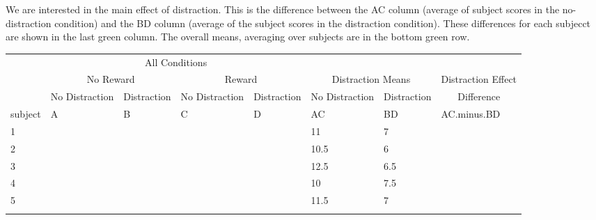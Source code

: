 \documentclass[
]{book}
\begin{document}
We are interested in the main effect of distraction. This is the difference between the AC column (average of subject scores in the no-distraction condition) and the BD column (average of the subject scores in the distraction condition). These differences for each subjecct are shown in the last green column. The overall means, averaging over subjects are in the bottom green row.

\begin{table}
\centering
\begin{tabular}{l|>{}l|>{}l|>{}l|>{}l|l|l|>{}l}
\hline
\multicolumn{1}{c|}{ } & \multicolumn{4}{c|}{ All Conditions} & \multicolumn{3}{c}{ } \\
\cline{2-5}
\multicolumn{1}{c|}{ } & \multicolumn{2}{c|}{No Reward} & \multicolumn{2}{c|}{Reward} & \multicolumn{2}{c|}{ Distraction Means } & \multicolumn{1}{c}{Distraction Effect } \\
\cline{2-3} \cline{4-5} \cline{6-7} \cline{8-8}
\multicolumn{1}{c|}{ } & \multicolumn{1}{c|}{No Distraction} & \multicolumn{1}{c|}{Distraction} & \multicolumn{1}{c|}{No Distraction} & \multicolumn{1}{c|}{Distraction} & \multicolumn{1}{c|}{No Distraction} & \multicolumn{1}{c|}{Distraction} & \multicolumn{1}{c}{Difference} \\
\cline{2-2} \cline{3-3} \cline{4-4} \cline{5-5} \cline{6-6} \cline{7-7} \cline{8-8}
subject & A & B & C & D & AC & BD & AC.minus.BD\\
\hline
1 & \cellcolor{yellow}{10} & \cellcolor{lightblue}{5} & \cellcolor{yellow}{12} & \cellcolor{lightblue}{9} & 11 & 7 & \cellcolor{lightgreen}{4}\\
\hline
2 & \cellcolor{yellow}{8} & \cellcolor{lightblue}{4} & \cellcolor{yellow}{13} & \cellcolor{lightblue}{8} & 10.5 & 6 & \cellcolor{lightgreen}{4.5}\\
\hline
3 & \cellcolor{yellow}{11} & \cellcolor{lightblue}{3} & \cellcolor{yellow}{14} & \cellcolor{lightblue}{10} & 12.5 & 6.5 & \cellcolor{lightgreen}{6}\\
\hline
4 & \cellcolor{yellow}{9} & \cellcolor{lightblue}{4} & \cellcolor{yellow}{11} & \cellcolor{lightblue}{11} & 10 & 7.5 & \cellcolor{lightgreen}{2.5}\\
\hline
5 & \cellcolor{yellow}{10} & \cellcolor{lightblue}{2} & \cellcolor{yellow}{13} & \cellcolor{lightblue}{12} & 11.5 & 7 & \cellcolor{lightgreen}{4.5}\\
\hline
\cellcolor{lightgreen}{Means} & \cellcolor{lightgreen}{} & \cellcolor{lightgreen}{} & \cellcolor{lightgreen}{} & \cellcolor{lightgreen}{} & \cellcolor{lightgreen}{11.1} & \cellcolor{lightgreen}{6.8} & \cellcolor{lightgreen}{4.3}\\
\hline
\end{tabular}
\end{table}
\end{document}
